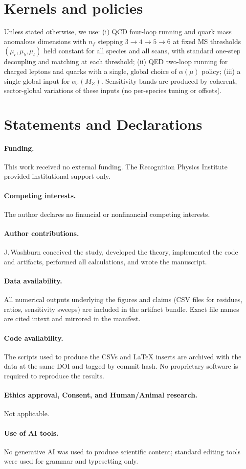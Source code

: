 \documentclass[epjc3]{svjour3}
\begin{document}
\section*{Kernels and policies}
Unless stated otherwise, we use:
(i) QCD four-loop running and quark mass anomalous dimensions with
$n_f$ stepping $3\to4\to5\to6$ at fixed $\overline{\mathrm{MS}}$ thresholds $(\mu_c,\mu_b,\mu_t)$ held constant for all species and all scans, with standard one-step decoupling and matching at each threshold;
(ii) QED two-loop running for charged leptons and quarks with a single, global choice of $\alpha(\mu)$ policy;
(iii) a single global input for $\alpha_s(M_Z)$.
Sensitivity bands are produced by coherent, sector-global variations of these inputs (no per-species tuning or offsets).

\section*{Statements and Declarations}

\paragraph{Funding.}
This work received no external funding. The Recognition Physics Institute provided institutional support only.

\paragraph{Competing interests.}
The author declares no financial or non\-financial competing interests.

\paragraph{Author contributions.}
J.\,Washburn conceived the study, developed the theory, implemented the code and artifacts, performed all calculations, and wrote the manuscript.

\paragraph{Data availability.}
All numerical outputs underlying the figures and claims (CSV files for residues, ratios, sensitivity sweeps) are included in the artifact bundle. Exact file names are cited in\-text and mirrored in the manifest.

\paragraph{Code availability.}
The scripts used to produce the CSVs and \LaTeX{} inserts are archived with the data at the same DOI and tagged by commit hash. No proprietary software is required to reproduce the results.

\paragraph{Ethics approval, Consent, and Human/Animal research.}
Not applicable.

\paragraph{Use of AI tools.}
No generative AI was used to produce scientific content; standard editing tools were used for grammar and typesetting only.
\end{document}
